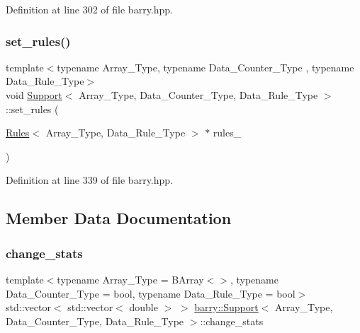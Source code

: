 Definition at line 302 of file barry.\+hpp.

\mbox{\label{classbarry_1_1_support_a66dc1a0e7097d547ea9c84df777ad477}} 
\subsubsection{\texorpdfstring{set\+\_\+rules()}{set\_rules()}}
{\footnotesize\ttfamily template$<$typename Array\+\_\+\+Type, typename Data\+\_\+\+Counter\+\_\+\+Type , typename Data\+\_\+\+Rule\+\_\+\+Type$>$ \\
void \hyperlink{classbarry_1_1_support}{Support}$<$ Array\+\_\+\+Type, Data\+\_\+\+Counter\+\_\+\+Type, Data\+\_\+\+Rule\+\_\+\+Type $>$\+::set\+\_\+rules (\begin{DoxyParamCaption}\item[{\hyperlink{classbarry_1_1_rules}{Rules}$<$ Array\+\_\+\+Type, Data\+\_\+\+Rule\+\_\+\+Type $>$ $\ast$}]{rules\+\_\+ }\end{DoxyParamCaption})\hspace{0.3cm}{\ttfamily [inline]}}



Definition at line 339 of file barry.\+hpp.



\subsection{Member Data Documentation}
\mbox{\label{classbarry_1_1_support_a37c139514065d10807cd574ca748744b}} 
\subsubsection{\texorpdfstring{change\+\_\+stats}{change\_stats}}
{\footnotesize\ttfamily template$<$typename Array\+\_\+\+Type = B\+Array$<$$>$, typename Data\+\_\+\+Counter\+\_\+\+Type = bool, typename Data\+\_\+\+Rule\+\_\+\+Type = bool$>$ \\
std\+::vector$<$ std\+::vector$<$ double $>$ $>$ \hyperlink{classbarry_1_1_support}{barry\+::\+Support}$<$ Array\+\_\+\+Type, Data\+\_\+\+Counter\+\_\+\+Type, Data\+\_\+\+Rule\+\_\+\+Type $>$\+::change\+\_\+stats}



